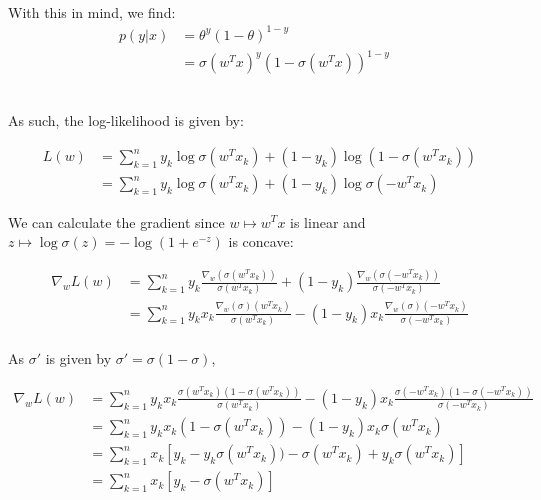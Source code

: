 \documentclass[a4paper, 11pt]{report}
\begin{document}
    \\ With this in mind, we find:
    \begin{equation*}
        \begin{aligned}
        p \left( y|x \right) &= \theta^y(1-\theta)^{1-y} & \\
        &= \sigma \left( w^Tx \right)^y \left( 1-\sigma \left( w^Tx \right) \right)^{1-y}
        \end{aligned}
    \end{equation*}
    \vspace*{.6em}
    
    \\ As such, the log-likelihood is given by:
    
    \begin{equation*}
        \begin{aligned}
        L \left( w \right) &= \sum_{k=1}^{n} y_k \log \sigma(w^Tx_k) + (1-y_k)\log(1 - \sigma(w^Tx_k)) \\
        &= \sum_{k=1}^{n} y_k \log \sigma(w^Tx_k) + (1-y_k)\log\sigma(-w^Tx_k)
        \end{aligned}
    \end{equation*}
    \vspace*{.6em}
    
    We can calculate the gradient since $w \mapsto w^Tx$ is linear and $z \mapsto \log \sigma(z) = - \log(1 + e^{-z}) $ is concave:
    
    \begin{equation*}
        \begin{aligned}
        \nabla_w L \left( w \right) &= \sum_{k=1}^{n} y_k \frac{ \nabla_w(\sigma(w^Tx_k)) }{\sigma(w^Tx_k)}  + (1-y_k)\frac{ \nabla_w(\sigma(-w^Tx_k)) }{\sigma(-w^Tx_k)} \\
        &= \sum_{k=1}^{n} y_k x_k \frac{ \nabla_w(\sigma)(w^Tx_k) }{\sigma(w^Tx_k)}  - (1-y_k)x_k \frac{ \nabla_w(\sigma)(-w^Tx_k) }{\sigma(-w^Tx_k)} \\
        \end{aligned}
    \end{equation*}
    \vspace*{.6em}
    
    As $\sigma'$ is given by $\sigma' = \sigma \left( 1 - \sigma \right)$,
    
    \begin{equation*}
        \begin{aligned}
        \nabla_w L \left( w \right) &= \sum_{k=1}^{n} y_k x_k \frac{ \sigma(w^Tx_k)(1 - \sigma(w^Tx_k)) }{\sigma(w^Tx_k)}  - (1-y_k)x_k \frac{ \sigma(-w^Tx_k)(1-\sigma(-w^Tx_k)) }{\sigma(-w^Tx_k)} \\
        &= \sum_{k=1}^{n} y_k x_k (1 - \sigma(w^Tx_k))  - (1-y_k)x_k \sigma(w^Tx_k) \\
        &= \sum_{k=1}^{n} x_k \left[y_k - y_k\sigma(w^Tx_k))  - \sigma(w^Tx_k) + y_k\sigma(w^Tx_k) \right]\\
        &= \sum_{k=1}^{n} x_k \left[y_k  - \sigma(w^Tx_k) \right]
        \end{aligned}
    \end{equation*}
    
\end{document}
